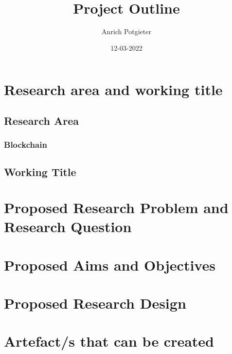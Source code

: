 \documentclass[12pt]{article}
\title{Project Outline}
\author{Anrich Potgieter}
\date{12-03-2022}
\begin{document}
\maketitle
\section{Research area and working title}
\subsection{Research Area}
\subsubsection[short]{Blockchain}
\subsection{Working Title}
\section{Proposed Research Problem and Research Question}
\section{Proposed Aims and Objectives}
\section{Proposed Research Design}
\section{Artefact/s that can be created}
\printbibliography
\end{document}
